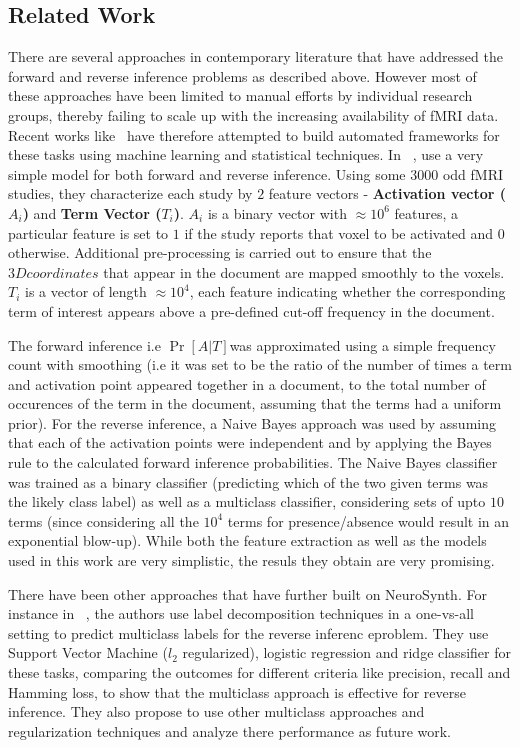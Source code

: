 \documentclass[11pt]{article}
\begin{document}
\subsection{Related Work}
There are several approaches in contemporary literature that have addressed the forward and reverse inference problems as described above. However most of these approaches have been limited to manual efforts by individual research groups, thereby failing to scale up with the increasing availability of fMRI data. Recent works like~\cite{yarkoni2011large, sanmi2013multi} have therefore attempted to build automated frameworks for these tasks using machine learning and statistical techniques.  In ~\cite{yarkoni2011large}, use a very simple model for both forward and reverse inference. Using some $3000$ odd fMRI studies, they characterize each study by $2$ feature vectors - \textbf{Activation vector ($A_i$)} and \textbf{Term Vector ($T_i$)}.  $A_i$ is a binary vector with $\approx 10^6$ features, a particular feature is set to $1$ if the study reports that voxel to be activated and $0$ otherwise. Additional pre-processing is carried out to ensure that the $3D coordinates$ that appear in the document are mapped smoothly to the voxels. $T_i$  is a vector of length $\approx 10^4$, each feature indicating whether the corresponding term of interest appears above a pre-defined cut-off frequency in the document. 

The forward inference i.e $\Pr[A \vert T] $was approximated using a simple frequency count with smoothing (i.e it was set to be the ratio of the number of times a term and activation point appeared together in a document, to the total  number of occurences of the term in the document, assuming that the terms had a uniform prior). For the reverse inference,  a Naive Bayes approach was used by assuming that each of the activation points were independent and by applying the Bayes rule to the calculated forward inference probabilities. The Naive Bayes classifier was trained as a binary classifier (predicting which of the two given terms was the likely class label) as well as a multiclass classifier, considering sets of upto $10$ terms (since considering all the $10^4$ terms for presence/absence would result in an exponential blow-up). While both the feature extraction as well as the models used in this work are very simplistic, the resuls they obtain are very promising. 

There have been other approaches that have further built on NeuroSynth. For instance in ~\cite{sanmi2013multi}, the authors use label decomposition techniques in a one-vs-all setting to predict multiclass labels for the reverse inferenc eproblem. They use Support Vector Machine ($l_2$ regularized), logistic regression and ridge classifier for these tasks,  comparing the outcomes for different criteria like precision, recall and Hamming loss, to show that the multiclass approach is effective for reverse inference. They also propose to use other multiclass approaches and regularization techniques and analyze there performance as future work. 
\end{document}
